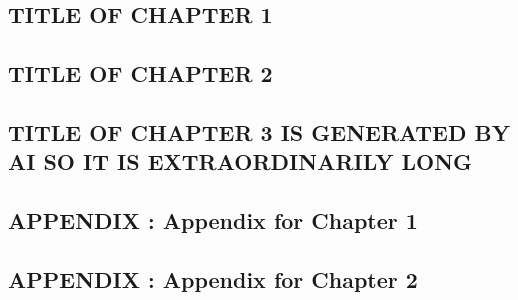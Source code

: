 \documentclass[12pt,letterpaper]{uncdissertation}
\begin{document}
\begin{doublespace}
\cleardoublepage
{}

\begin{singlespace}
\chapter{TITLE OF CHAPTER 1}
\end{singlespace}\label{chap1}


\begin{singlespace}
\chapter{TITLE OF CHAPTER 2}\label{chap2}
\end{singlespace}


\begin{singlespace}
\chapter{TITLE OF CHAPTER 3 IS GENERATED BY AI SO IT IS EXTRAORDINARILY LONG}\label{chap3}
\end{singlespace}


\titlespacing{\chapter}{0pt}{-.375in}{12pt}
\appendix
\renewcommand{\appendixname}{APPENDIX}
\renewcommand{\cftchappresnum}{APPENDIX\ }
\renewcommand{\cftchapaftersnum}{:\ }
\settowidth{\cftchapnumwidth}{APPENDIX D:\ }

\begin{singlespace}
\chapter*{APPENDIX \thechapter: Appendix for Chapter 1}
\end{singlespace}


\begin{singlespace}
\chapter*{APPENDIX \thechapter: Appendix for Chapter 2}
\end{singlespace}



\end{doublespace}
\end{document}
